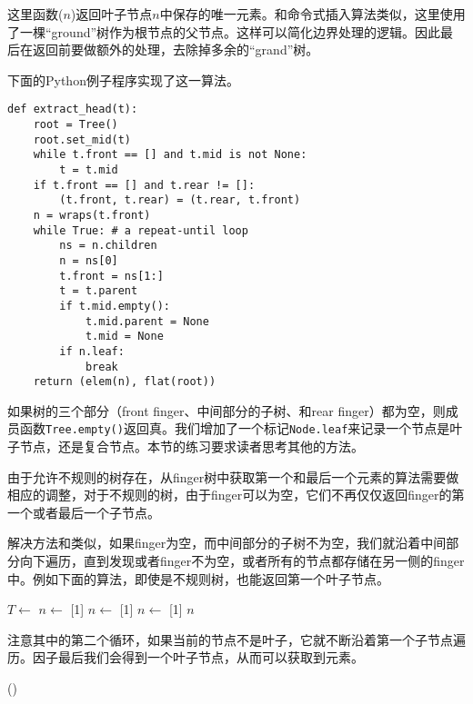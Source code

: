 \documentclass[UTF8]{article}
\begin{document}
这里函数($n$)返回叶子节点$n$中保存的唯一元素。和命令式插入算法类似，这里使用了一棵“ground”树作为根节点的父节点。这样可以简化边界处理的逻辑。因此最后在返回前要做额外的处理，去除掉多余的“grand”树。

下面的Python例子程序实现了这一算法。

\lstset{language=Python}
\begin{lstlisting}
def extract_head(t):
    root = Tree()
    root.set_mid(t)
    while t.front == [] and t.mid is not None:
        t = t.mid
    if t.front == [] and t.rear != []:
        (t.front, t.rear) = (t.rear, t.front)
    n = wraps(t.front)
    while True: # a repeat-until loop
        ns = n.children
        n = ns[0]
        t.front = ns[1:]
        t = t.parent
        if t.mid.empty():
            t.mid.parent = None
            t.mid = None
        if n.leaf:
            break
    return (elem(n), flat(root))
\end{lstlisting}

如果树的三个部分（front finger、中间部分的子树、和rear finger）都为空，则成员函数\texttt{Tree.empty()}返回真。我们增加了一个标记\texttt{Node.leaf}来记录一个节点是叶子节点，还是复合节点。本节的练习要求读者思考其他的方法。

由于允许不规则的树存在，从finger树中获取第一个和最后一个元素的算法需要做相应的调整，对于不规则的树，由于finger可以为空，它们不再仅仅返回finger的第一个或者最后一个子节点。

解决方法和类似，如果finger为空，而中间部分的子树不为空，我们就沿着中间部分向下遍历，直到发现或者finger不为空，或者所有的节点都存储在另一侧的finger中。例如下面的算法，即使是不规则树，也能返回第一个叶子节点。

\begin{algorithmic}
    \State $T \gets$ 
  \EndWhile
    \State $n \gets$ [1]
  \Else
    \State $n \gets$ [1]
  \EndIf
    \State $n \gets$ [1]
  \EndWhile
  \State \Return $n$
\EndFunction
\end{algorithmic}

注意其中的第二个循环，如果当前的节点不是叶子，它就不断沿着第一个子节点遍历。因子最后我们会得到一个叶子节点，从而可以获取到元素。

\begin{algorithmic}
  \State \Return {}()
\EndFunction
\end{algorithmic}
\end{document}
